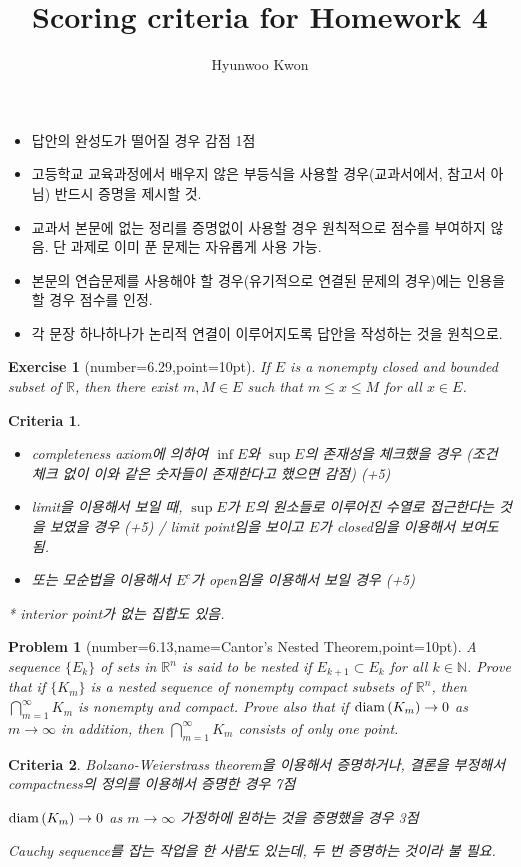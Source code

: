 \documentclass[oldfontcommands]{oblivoir}%
\title{Scoring criteria for Homework 4}
\author{Hyunwoo Kwon}
\newtheorem{exercise}{Exercise}[.exercise_box]
\newtheorem{problem}{Problem}[.exercise_box]
\newtheorem{criteria}{Criteria}
\begin{document}
\maketitle 

\begin{itemize}
\item 답안의 완성도가 떨어질 경우 감점 1점
\item 고등학교 교육과정에서 배우지 않은 부등식을 사용할 경우(교과서에서, 참고서 아님) 반드시 증명을 제시할 것. 
\item 교과서 본문에 없는 정리를 증명없이 사용할 경우 원칙적으로 점수를 부여하지 않음. 단 과제로 이미 푼 문제는 자유롭게 사용 가능. 
\item 본문의 연습문제를 사용해야 할 경우(유기적으로 연결된 문제의 경우)에는 인용을 할 경우 점수를 인정. 
\item 각 문장 하나하나가 논리적 연결이 이루어지도록 답안을 작성하는 것을 원칙으로. 
\end{itemize}
 
 
 
 
 \begin{exercise}[number=6.29,point=10pt]\label{ex:closed and bounded-max and min}
 If  $E$ is  a nonempty closed and bounded subset of $\mathbb{R}$, then there exist $m , M \in E$ such that $m \le x \le M$ for all $x \in E$.
 \end{exercise} 
 \begin{criteria}\,
 \begin{itemize}
 \item  completeness axiom에 의하여 $\inf E$와 $\sup E$의 존재성을 체크했을 경우 (조건 체크 없이 이와 같은 숫자들이 존재한다고 했으면 감점) (+5)
 \item limit을 이용해서 보일 때, $\sup E$가 $E$의 원소들로 이루어진 수열로 접근한다는 것을 보였을 경우 (+5) / limit point임을 보이고 $E$가 closed임을 이용해서 보여도 됨. 
 \item 또는 모순법을 이용해서 $E^c$가 open임을 이용해서 보일 경우 (+5)
 \end{itemize}
 
 * interior point가 없는 집합도 있음.  
 \end{criteria}
  
 
 \begin{problem}[number=6.13,name=Cantor's Nested Theorem,point=10pt]
 A sequence $\{E_k \}$ of sets in $\mathbb{R}^n$ is said to be {\it nested} if $E_{k+1} \subset E_k$ for all $k\in \mathbb{N}$. Prove that if $\{K_m\}$ is a nested sequence  of nonempty compact subsets of $\mathbb{R}^n$, then  $\bigcap_{m=1}^\infty K_m$ is nonempty and compact.
 Prove also that  if ${\rm diam}\, (K_m ) \to 0$ as $m \to \infty$ in addition, then  $\bigcap_{m=1}^\infty K_m$ consists of only one point.
 \end{problem}
 \begin{criteria}
 Bolzano-Weierstrass theorem을 이용해서 증명하거나, 결론을 부정해서 compactness의 정의를 이용해서 증명한 경우 7점
 
 ${\rm diam}\, (K_m ) \to 0$ as $m \to \infty$ 가정하에 원하는 것을 증명했을 경우 3점
 
 Cauchy sequence를 잡는 작업을 한 사람도 있는데, 두 번 증명하는 것이라 불 필요. 
  \end{criteria}
 
\end{document}
